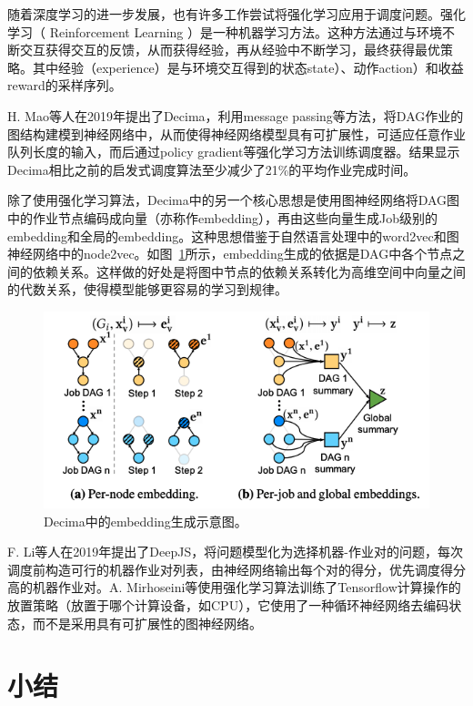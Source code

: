 随着深度学习的进一步发展，也有许多工作尝试将强化学习应用于调度问题。强化学习（ Reinforcement Learning ）是一种机器学习方法。这种方法通过与环境不断交互获得交互的反馈，从而获得经验，再从经验中不断学习，最终获得最优策略。其中经验（experience）是与环境交互得到的状态state）、动作action）和收益reward的采样序列。

H. Mao等人在2019年提出了Decima，利用message passing等方法，将DAG作业的图结构建模到神经网络中，从而使得神经网络模型具有可扩展性，可适应任意作业队列长度的输入，而后通过policy gradient等强化学习方法训练调度器。结果显示Decima相比之前的启发式调度算法至少减少了21\%的平均作业完成时间。

除了使用强化学习算法，Decima中的另一个核心思想是使用图神经网络将DAG图中的作业节点编码成向量（亦称作embedding），再由这些向量生成Job级别的embedding和全局的embedding。这种思想借鉴于自然语言处理中的word2vec和图神经网络中的node2vec。如图~\ref{decima_embedding}所示，embedding生成的依据是DAG中各个节点之间的依赖关系。这样做的好处是将图中节点的依赖关系转化为高维空间中向量之间的代数关系，使得模型能够更容易的学习到规律。

\begin{figure}[h]
    \centerline{\includegraphics[width=\textwidth]{figures/decima-embedding.png}}
    \caption{Decima中的embedding生成示意图。}
    \label{decima_embedding}
\end{figure}

F. Li等人在2019年提出了DeepJS\parencite{li2019deepjs}，将问题模型化为选择机器-作业对的问题，每次调度前构造可行的机器作业对列表，由神经网络输出每个对的得分，优先调度得分高的机器作业对。A. Mirhoseini等\parencite{mirhoseini2017device}使用强化学习算法训练了Tensorflow计算操作的放置策略（放置于哪个计算设备，如CPU），它使用了一种循环神经网络去编码状态，而不是采用具有可扩展性的图神经网络。

\section{小结}

